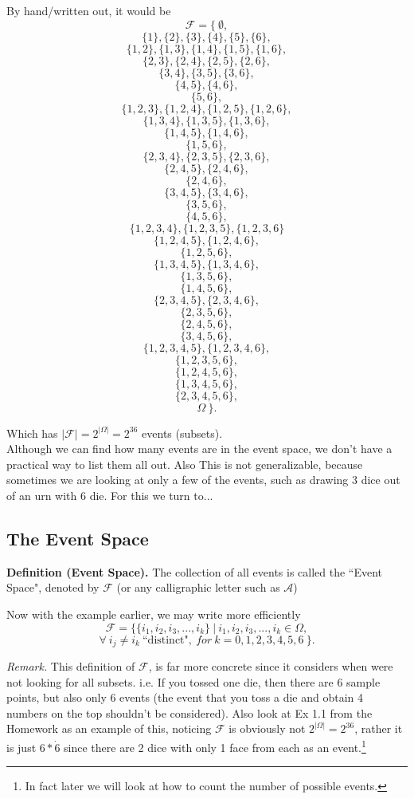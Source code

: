 \documentclass[12pt]{book}
\begin{document}
By hand/written out, it would be 
$$\mathcal{F}= \Big\{ ~\emptyset,$$
$$\{1\}, \{2\}, \{3\}, \{4\}, \{5\}, \{6\},$$
$$~$$
$$\{1,2\}, \{1,3\}, \{1,4\}, \{1,5\}, \{1,6\}, $$ 
$$\{2,3\}, \{2,4\}, \{2,5\}, \{2,6\},  $$
$$\{3,4\}, \{3,5\}, \{3,6\},  $$
$$\{4,5\}, \{4,6\},  $$
$$\{5,6\},  $$
$$~$$
$$\{1,2,3\}, \{1,2,4\}, \{1,2,5\}, \{1,2,6\},  $$
$$\{1,3,4\}, \{1,3,5\}, \{1,3,6\}, $$
$$\{1,4,5\}, \{1,4,6\}, $$
$$\{1,5,6\},$$
$$\{2,3,4\}, \{2,3,5\},  \{2,3,6\},  $$
$$\{2,4,5\}, \{2,4,6\},$$
$$\{2,4,6\},$$
$$\{3,4,5\}, \{3,4,6\},$$
$$\{3,5,6\}, $$
$$\{4,5,6\},$$
$$~$$
$$\{1,2,3,4\}, \{1,2,3,5\}, \{1,2,3,6\}$$
$$\{1,2,4,5\}, \{1,2,4,6\},$$
$$\{1,2,5,6\},$$
$$\{1,3,4,5\}, \{1,3,4,6\},$$
$$\{1,3,5,6\},$$
$$\{1,4,5,6\},$$
$$\{2,3,4,5\}, \{2,3,4,6\}, $$
$$\{2,3,5,6\},  $$
$$\{2,4,5,6\}, $$
$$\{3,4,5,6\},$$
$$~$$
$$\{1,2,3,4,5\}, \{1,2,3,4,6\}, $$
$$\{1,2,3,5,6\}, $$
$$\{1,2,4,5,6\}, $$
$$\{1,3,4,5,6\}, $$
$$\{2,3,4,5,6\},$$
$$\Omega ~\Big\}.$$

\noindent Which has $|\mathcal{F}| = 2^{|\Omega|} = 2^{36}$ events (subsets).\\

Although we can find how many events are in the event space, we don't have a practical way to list them all out. Also This is not generalizable, because sometimes we are looking at only a few of the events, such as drawing 3 dice out of an urn with 6 die. For this we turn to...

\subsection{The Event Space}

\textbf{Definition (Event Space).} The collection of all events is called the ``Event Space", denoted by $\mathcal{F}$ (or any calligraphic letter such as $\mathcal{A}$)

Now with the example earlier, we may write more efficiently
$$\mathcal{F}=\Big\{ \{i_1, i_2, i_3, ..., i_k\} ~\Big|~ i_1, i_2, i_3, ..., i_k\in\Omega,$$
$$\forall~ i_j \neq i_k ~ \text{``distinct"}, ~ for ~ k=0,1,2,3,4,5,6~ \Big\}.$$

\noindent \textit{Remark.} This definition of $\mathcal{F}$, is far more concrete since it considers when were not looking for all subsets. 
i.e. If you tossed one die, then there are 6 sample points, but also only 6 events (the event that you toss a die and obtain 4 numbers on the top shouldn't be considered). Also look at Ex 1.1 from the Homework as an example of this, noticing $\mathcal{F}$ is obviously not $2^{|\Omega|}=2^{36}$, rather it is just $6*\dot6$ since there are 2 dice with only 1 face from each as an event.\footnote{In fact later we will look at how to count the number of possible events.}
\end{document}
